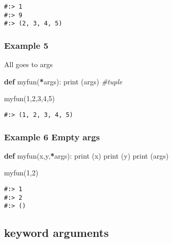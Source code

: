 \documentclass[
]{book}
\newenvironment{Shaded}{\begin{snugshade}}{\end{snugshade}}
\newcommand{\BuiltInTok}[1]{#1}
\newcommand{\CommentTok}[1]{\textcolor[rgb]{0.37,0.37,0.37}{\textit{#1}}}
\newcommand{\DecValTok}[1]{\textcolor[rgb]{0.06,0.06,0.06}{#1}}
\newcommand{\KeywordTok}[1]{\textcolor[rgb]{0.27,0.27,0.27}{\textbf{#1}}}
\newcommand{\NormalTok}[1]{#1}
\newcommand{\OperatorTok}[1]{\textcolor[rgb]{0.43,0.43,0.43}{\textbf{#1}}}
\begin{document}
\begin{verbatim}
#:> 1
#:> 9
#:> (2, 3, 4, 5)
\end{verbatim}

\hypertarget{example-5}{%
\subsubsection{Example 5}\label{example-5}}

All goes to args

\begin{Shaded}
\begin{Highlighting}[]
\KeywordTok{def}\NormalTok{ myfun(}\OperatorTok{*}\NormalTok{args):}
    \BuiltInTok{print}\NormalTok{ (args)     }\CommentTok{\#tuple}
    
\NormalTok{myfun(}\DecValTok{1}\NormalTok{,}\DecValTok{2}\NormalTok{,}\DecValTok{3}\NormalTok{,}\DecValTok{4}\NormalTok{,}\DecValTok{5}\NormalTok{)}
\end{Highlighting}
\end{Shaded}

\begin{verbatim}
#:> (1, 2, 3, 4, 5)
\end{verbatim}

\hypertarget{example-6-empty-args}{%
\subsubsection{Example 6 Empty args}\label{example-6-empty-args}}

\begin{Shaded}
\begin{Highlighting}[]
\KeywordTok{def}\NormalTok{ myfun(x,y,}\OperatorTok{*}\NormalTok{args):}
    \BuiltInTok{print}\NormalTok{ (x)}
    \BuiltInTok{print}\NormalTok{ (y)}
    \BuiltInTok{print}\NormalTok{ (args)}
    
\NormalTok{myfun(}\DecValTok{1}\NormalTok{,}\DecValTok{2}\NormalTok{)}
\end{Highlighting}
\end{Shaded}

\begin{verbatim}
#:> 1
#:> 2
#:> ()
\end{verbatim}

\hypertarget{keyword-arguments}{%
\subsection{keyword arguments}\label{keyword-arguments}}
\end{document}
